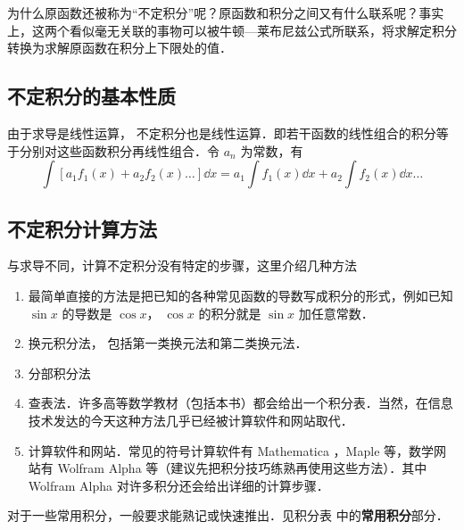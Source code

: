 为什么原函数还被称为“不定积分”呢？原函数和积分之间又有什么联系呢？事实上，这两个看似毫无关联的事物可以被牛顿—莱布尼兹公式所联系，将求解定积分转换为求解原函数在积分上下限处的值．

\subsection{不定积分的基本性质}

由于求导是线性运算，
不定积分也是线性运算．即若干函数的线性组合的积分等于分别对这些函数积分再线性组合．令 $a_n$ 为常数，有
\begin{equation}\label{Int_eq4}
\int [a_1 f_1(x) + a_2 f_2(x)\dots] \dd{x}  = a_1 \int f_1(x) \dd{x} + a_2 \int f_2(x) \dd{x} \dots
\end{equation}

\subsection{不定积分计算方法}
与求导不同，计算不定积分没有特定的步骤，这里介绍几种方法
\begin{enumerate}
\item 最简单直接的方法是把已知的各种常见函数的导数写成积分的形式，例如已知 $\sin x$ 的导数是 $\cos x$， $\cos x$ 的积分就是 $\sin x$ 加任意常数．
\item 换元积分法， 包括第一类换元法和第二类换元法．

\item 分部积分法

\item 查表法．许多高等数学教材（包括本书）都会给出一个积分表．当然，在信息技术发达的今天这种方法几乎已经被计算软件和网站取代．

\item 计算软件和网站．常见的符号计算软件有 Mathematica %
，Maple 等，数学网站有 Wolfram Alpha %
等（建议先把积分技巧练熟再使用这些方法）．其中 Wolfram Alpha 对许多积分还会给出详细的计算步骤．
 \end{enumerate}

对于一些常用积分，一般要求能熟记或快速推出．见积分表 中的\textbf{常用积分}部分．%



